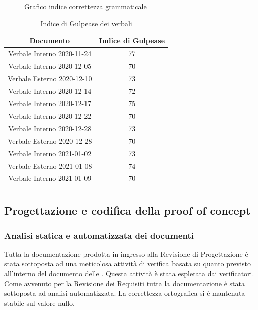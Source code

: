 \begin{center}
\begin{figure}[!htb]
        \caption{Grafico indice correttezza grammaticale}
    \end{figure}
    \begin{center}
        \begin{longtable}{|c|c|}
            \hline
            \rowcolor{lighter-grayer}
            \textbf{Documento}         & \textbf{Indice di Gulpease} \\
            \hline
            \endfirsthead

            \hline
            Verbale Interno 2020-11-24 & 77                          \\
            Verbale Interno 2020-12-05 & 70                          \\              
            Verbale Esterno 2020-12-10 & 73                          \\
            Verbale Interno 2020-12-14 & 72                          \\
            Verbale Interno 2020-12-17 & 75                          \\
            Verbale Interno 2020-12-22 & 70                          \\
            Verbale Interno 2020-12-28 & 73                          \\
            Verbale Esterno 2020-12-28 & 70                         \\
            Verbale Interno 2021-01-02 & 73                          \\
            Verbale Esterno 2021-01-08 & 74                          \\
            Verbale Interno 2021-01-09 & 70                          \\
            
            \hline
            \rowcolor{white}
            \caption{Indice di Gulpease dei verbali}
        \end{longtable}
    \end{center}
\end{center}

\newpage
\subsection{Progettazione e codifica della proof of concept} 

\subsubsection{Analisi statica e automatizzata dei documenti}\label{resocontoProgettazione}
Tutta la documentazione prodotta in ingresso alla Revisione di Progettazione è stata sottoposta ad una meticolosa attività di verifica
basata su quanto previsto all'interno del documento delle .
Questa attività è stata espletata dai verificatori.
Come avvenuto per la Revisione dei Requisiti tutta la documentazione è stata sottoposta ad analisi automatizzata.
La correttezza ortografica si è mantenuta stabile sul valore nullo.

